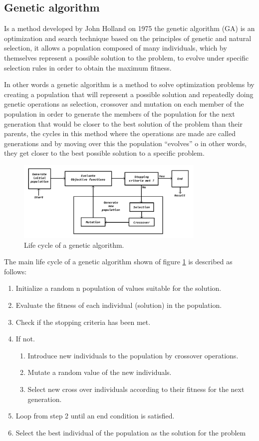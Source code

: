 \documentclass[conference]{IEEEtran}
\begin{document}
\subsection{Genetic algorithm}
Is a method developed by John Holland on 1975 \cite{Holland1975} the genetic algorithm (GA) is an optimization and search technique based on the principles of genetic and natural selection, it allows a population composed of many individuals, which by themselves represent a possible solution to the problem, to evolve under specific selection rules in order to obtain the maximum fitness.

In other words a genetic algorithm is a method to solve optimization problems by creating a population that will represent a possible solution and repeatedly doing genetic operations as selection, crossover and mutation on each member of the population in order to generate the members of the population for the next generation that would be closer to the best solution of the problem than their parents, the cycles in this method where the operations are made are called generations and by moving over this the population “evolves” o in other words, they get closer to the best possible solution  to a specific problem.

\begin{figure}[htbp]
\centerline{\includegraphics[width=90mm]{Images/ga_life_cycle.png}}
\caption{Life cycle of a genetic algorithm.}
\label{algorithm_model}
\end{figure}

The main life cycle of a genetic algorithm shown of figure \ref{algorithm_model} is described as follows:
\begin{enumerate}
    \item Initialize a random n population of values suitable for the solution.
    \item Evaluate the fitness of each individual (solution) in the population.
    \item Check if the stopping criteria has been met.
    \item If not.
    \begin{enumerate}
        \item Introduce new individuals to the population by crossover operations.
        \item Mutate a random value of the new individuals.
        \item Select new cross over individuals according to their fitness for the next generation.
    \end{enumerate}
    \item Loop from step 2 until an end condition is satisfied.
    \item Select the best individual of the population as the solution for the problem
\end{enumerate}
\end{document}
